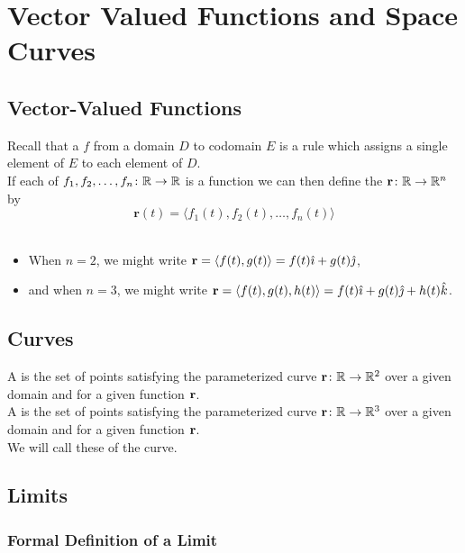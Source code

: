 \newpage

\section{Vector Valued Functions and Space Curves}

\subsection{Vector-Valued Functions}

Recall that a  \(f\) from a domain \(D\) to codomain \(E\) is a rule which assigns a single element of \(E\) to each element of \(D\). \\

If each of \(f_{1},f_{2},\ldots,f_{n} \colon \mathbb{R} \to \mathbb{R}\) is a function we can then define the  \(\mathbf{r} \colon \mathbb{R} \to \mathbb{R}^{n}\) by
\[
    \mathbf{r}(t) = \langle f_{1}(t),f_{2}(t),\ldots,f_{n}(t) \rangle
\]\
\begin{itemize}
    \item When \(n = 2\), we might write \(\mathbf{r} = \left\langle f(t),g(t) \right\rangle = f(t)\hat{\imath} + g(t)\hat{\jmath}\),
    \item and when \(n = 3\), we might write \(\mathbf{r} = \left\langle f(t),g(t),h(t) \right\rangle = f(t)\hat{\imath} + g(t)\hat{\jmath} + h(t)\hat{k}\).
\end{itemize}

\subsection{Curves}

A  is the set of points satisfying the parameterized curve \(\mathbf{r} \colon \mathbb{R} \to \mathbb{R}^{2}\) over a given domain and for a given function \(\mathbf{r}\). \\

A  is the set of points satisfying the parameterized curve \(\mathbf{r} \colon \mathbb{R} \to \mathbb{R}^{3}\) over a given domain and for a given function \(\mathbf{r}\). \\

We will call these  of the curve.

\subsection{Limits}

\subsubsection{Formal Definition of a Limit}

